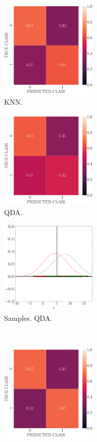 \documentclass[12pt, a4 paper]{article}
\begin{document}
\begin{figure}[!htbp]
\centering
    \begin{subfigure}[!htbp]{0.24\textwidth}
       \centering
       \includegraphics[width=1.8in]{../results/ex3/conf_mtx_KNN_dataset_P3b_size_199.pdf}
       \caption{KNN.}
       \label{fig:KNN_P3b}
    \end{subfigure}
\quad \quad
    \begin{subfigure}[!htbp]{0.24\textwidth}
       \centering
       \includegraphics[width=1.8in]{../results/ex3/conf_mtx_QD_ML_dataset_P3b_size_199.pdf}
       \caption{QDA.}
       \label{fig:QDA_P3b}
    \end{subfigure}
\quad \quad
    \begin{subfigure}[!htbp]{0.24\textwidth}
       \centering
       \includegraphics[width=1.8in]{../results/ex3/samples_QD_ML_dataset_P3b_size_199.pdf}
       \caption{Samples. QDA.}
       \label{fig:DF_QDA_P3b}
    \end{subfigure}
\\
    \begin{subfigure}[!htbp]{0.24\textwidth}
       \centering
       \includegraphics[width=1.8in]{../results/ex3/conf_mtx_GMM_dataset_P3b_size_199.pdf}

\end{subfigure}
\end{figure}
\end{document}
